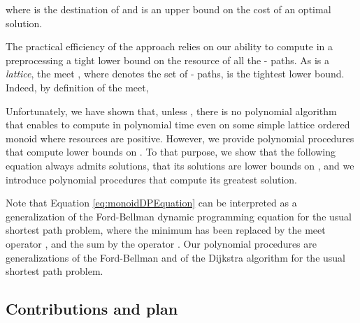\documentclass[11pt]{amsart}
\theoremstyle{plain}
\theoremstyle{remark}
\begin{document}
where  is the destination of  and  is an upper bound on the cost of an optimal solution.

The practical efficiency of the approach relies on our ability to compute in a preprocessing a tight lower bound on the resource of all the - paths. As  is a \emph{lattice}, the meet , where  denotes the set of - paths, is the tightest lower bound. Indeed, by definition of the meet,

Unfortunately, we have shown \cite{parmentier2016thesis} that, unless , there is no polynomial algorithm that enables to compute  in polynomial time even on some simple lattice ordered monoid where resources are positive. However, we provide polynomial procedures that compute lower bounds on . To that purpose, we show that the following equation always admits solutions, that its solutions are lower bounds on , and we introduce polynomial procedures that compute its greatest solution.

Note that Equation \eqref{eq:monoidDPEquation} can be interpreted as a generalization of the Ford-Bellman dynamic programming equation for the usual shortest path problem, where the minimum has been replaced by the meet operator , and the sum by the operator . Our polynomial procedures are generalizations of the Ford-Bellman and of the Dijkstra algorithm for the usual shortest path problem.

\subsection{Contributions and plan} \label{sub:contributions_and_plan}
\end{document}
